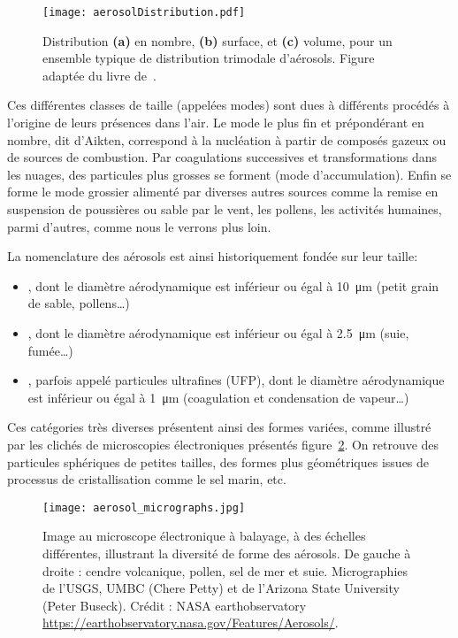 \begin{figure}[ht]
    \centering
    \texttt{[image: aerosolDistribution.pdf]}
    \caption{Distribution \textbf{(a)} en nombre, \textbf{(b)} surface, et
        \textbf{(c)} volume, pour un ensemble typique de distribution trimodale
        d'aérosols. Figure adaptée du livre de~\cite{seinfieldAtmospheric1998}.}
    \label{fig:aerosolDistribution}
\end{figure}

Ces différentes classes de taille (appelées modes) sont dues à différents procédés à
l'origine de leurs présences dans l'air. Le mode le plus fin et prépondérant en nombre,
dit d'Aikten, correspond à la nucléation à partir de composés gazeux ou de sources de
combustion.  Par coagulations successives et transformations dans les nuages, des
particules plus grosses se forment (mode d'accumulation).  Enfin se forme le mode grossier
alimenté par diverses autres sources comme la remise en suspension de poussières ou sable
par le vent, les pollens, les activités humaines, parmi d'autres, comme nous le verrons
plus loin.

La nomenclature des aérosols est ainsi historiquement fondée sur leur taille:
\begin{itemize}
    \item \PMdix, dont le diamètre aérodynamique est inférieur ou égal à \SI{10}{\um} (petit
        grain de sable, pollens…)
    \item \PMdc, dont le diamètre aérodynamique est inférieur ou égal à \SI{2.5}{\um}
        (suie, fumée…)
    \item \PMun, parfois appelé particules ultrafines (UFP), dont le diamètre
        aérodynamique est inférieur ou égal à \SI{1}{\um} (coagulation et condensation de
        vapeur…)
\end{itemize}


Ces catégories très diverses présentent ainsi des formes variées, comme illustré par les
clichés de microscopies électroniques présentés figure~\ref{fig:micrography}. On retrouve
des particules sphériques de petites tailles, des formes plus géométriques issues de
processus de cristallisation comme le sel marin, etc.

\begin{figure}[ht]
    \centering
    \texttt{[image: aerosol\_micrographs.jpg]}
    \caption{Image au microscope électronique à balayage, à des échelles différentes,
        illustrant la diversité de forme des aérosols.
        De gauche à droite : cendre volcanique, pollen, sel de mer et suie. Micrographies de
        l'USGS, UMBC (Chere Petty) et de l'Arizona State University (Peter Buseck). 
        Crédit : NASA earthobservatory \url{https://earthobservatory.nasa.gov/Features/Aerosols/}.
    }
    \label{fig:micrography}
\end{figure}

